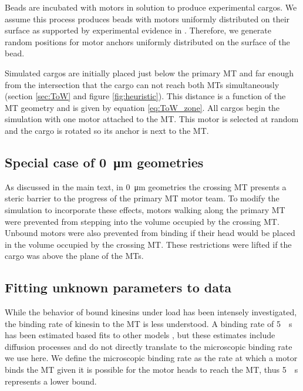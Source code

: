 Beads are incubated with motors in solution to produce experimental cargos. We assume this process produces beads with motors uniformly distributed on their surface as supported by experimental evidence in \cite{Li2016}. Therefore, we generate random positions for motor anchors uniformly distributed on the surface of the bead.

Simulated cargos are initially placed just below the primary MT and far enough from the intersection that the cargo can not reach both MTs simultaneously (section \ref{sec:ToW} and figure \ref{fig:heuristic}). This distance is a function of the MT geometry and is given by equation \ref{eq:ToW_zone}. All cargos begin the simulation with one motor attached to the MT. This motor is selected at random and the cargo is rotated so its anchor is next to the MT.

\subsection{Special case of \SI{0}{\micro\meter} geometries} \label{sec:0micron}

As discussed in the main text, in \SI{0}{\micro\meter} geometries the crossing MT presents a steric barrier to the progress of the primary MT motor team. To modify the simulation to incorporate these effects, motors walking along the primary MT were prevented from stepping into the volume occupied by the crossing MT. Unbound motors were also prevented from binding if their head would be placed in the volume occupied by the crossing MT. These restrictions were lifted if the cargo was above the plane of the MTs.

\subsection{Fitting unknown parameters to data} \label{param_fit}

While the behavior of bound kinesins under load has been intensely investigated, the binding rate of kinesin to the MT is less understood. A binding rate of \SI{5}{\per\second} has been estimated based fits to other models \cite{Leduc2004,Klumpp2005}, but these estimates include diffusion processes and do not directly translate to the microscopic binding rate we use here. We define the microscopic binding rate as the rate at which a motor binds the MT given it is possible for the motor heads to reach the MT, thus \SI{5}{\per\second} represents a lower bound.

